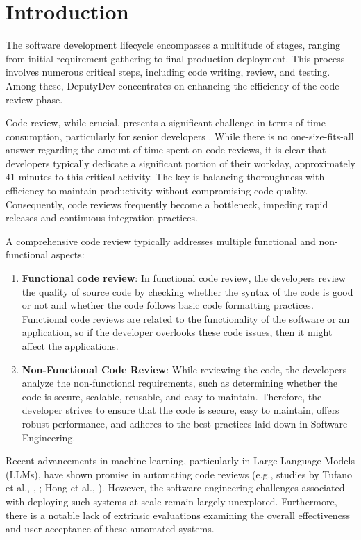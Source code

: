 \section{Introduction}
The software development lifecycle encompasses a multitude of stages, ranging from initial requirement gathering to final production deployment. This process involves numerous critical steps, including code writing, review, and testing. Among these, DeputyDev concentrates on enhancing the efficiency of the code review phase.

Code review, while crucial, presents a significant challenge in terms of time consumption, particularly for senior developers \cite{Vijayvergiya_2024}. While there is no one-size-fits-all answer regarding the amount of time spent on code reviews, it is clear that developers typically dedicate a significant portion of their workday, approximately 41 minutes \cite{softwareCodeTime} to this critical activity. The key is balancing thoroughness with efficiency to maintain productivity without compromising code quality. Consequently, code reviews frequently become a bottleneck, impeding rapid releases and continuous integration practices.

A comprehensive code review typically addresses multiple functional and non-functional aspects:

\begin{enumerate}
    \item \textbf{Functional code review}: In functional code review, the developers review the quality of source code by checking whether the syntax of the code is good or not and whether the code follows basic code formatting practices. Functional code reviews are related to the functionality of the software or an application, so if the developer overlooks these code issues, then it might affect the applications.

    \item \textbf{Non-Functional Code Review}: While reviewing the code, the developers analyze the non-functional requirements, such as determining whether the code is secure, scalable, reusable, and easy to maintain. Therefore, the developer strives to ensure that the code is secure, easy to maintain, offers robust performance, and adheres to the best practices laid down in Software Engineering.

\end{enumerate}

Recent advancements in machine learning, particularly in Large Language Models (LLMs), have shown promise in automating code reviews (e.g., studies by Tufano et al.,  \cite{tufano2024codereviewautomationstrengths},  \cite{tufano2022usingpretrainedmodelsboost}; Hong et al., \cite{10.1145/3540250.3549119}). However, the software engineering challenges associated with deploying such systems at scale remain largely unexplored. Furthermore, there is a notable lack of extrinsic evaluations examining the overall effectiveness and user acceptance of these automated systems.

